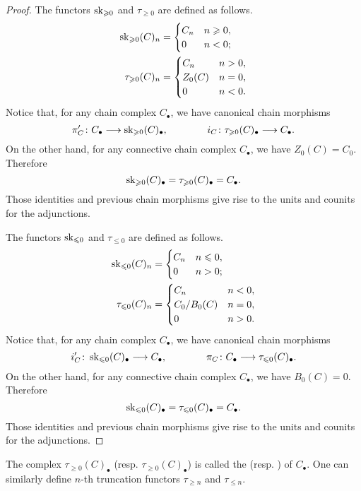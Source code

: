 \begin{proof}
The functors $\operatorname{sk}_{\geqslant0}$ and $\tau_{\ge0}$ are defined as follows.
\begin{align*}
\operatorname{sk}_{\geqslant0}(C)_n & =
\begin{cases}
C_n & n\geqslant0,\\
0 & n<0;
\end{cases} \\
\tau_{\geqslant0}(C)_n & =
\begin{cases}
C_n & n>0,\\
Z_0(C) & n=0,\\
0 & n<0.
\end{cases}
\end{align*}
Notice that, for any chain complex $C_{\bullet}$,
we have canonical chain morphisms
\[
\pi'_C\colon C_{\bullet}\longrightarrow\operatorname{sk}_{\geqslant0}(C)_{\bullet},\qquad\qquad
i_C\colon \tau_{\geqslant0}(C)_{\bullet}\longrightarrow C_{\bullet}.
\]
On the other hand, for any connective chain complex $C_{\bullet}$,
we have $Z_0(C)=C_0$. Therefore
\[
\operatorname{sk}_{\geqslant0}(C)_{\bullet} = \tau_{\geqslant0}(C)_{\bullet} = C_{\bullet}.
\]
Those identities and previous chain morphisms give rise to the 
units and counits for the adjunctions.

The functors $\operatorname{sk}_{\leqslant0}$ and $\tau_{\le0}$ are defined as follows.
\begin{align*}
\operatorname{sk}_{\leqslant0}(C)_n & =
\begin{cases}
C_n & n\leqslant0,\\
0 & n>0;
\end{cases} \\
\tau_{\leqslant0}(C)_n & =
\begin{cases}
C_n & n<0,\\
C_0/B_0(C) & n=0,\\
0 & n>0.
\end{cases}
\end{align*}
Notice that, for any chain complex $C_{\bullet}$,
we have canonical chain morphisms
\[
i'_C\colon \operatorname{sk}_{\leqslant0}(C)_{\bullet}\longrightarrow C_{\bullet},\qquad\qquad
\pi_C\colon C_{\bullet}\longrightarrow\tau_{\leqslant0}(C)_{\bullet}.
\]
On the other hand, for any connective chain complex $C_{\bullet}$,
we have $B_0(C)=0$. Therefore
\[
\operatorname{sk}_{\leqslant0}(C)_{\bullet} = \tau_{\leqslant0}(C)_{\bullet} = C_{\bullet}.
\]
Those identities and previous chain morphisms give rise to the 
units and counits for the adjunctions.
\end{proof}
\begin{Rem}
The complex $\tau_{\ge0}(C)_{\bullet}$ (resp. $\tau_{\ge0}(C)_{\bullet}$) 
is called the 
(resp. )
of $C_{\bullet}$. 
One can similarly define $n$-th truncation functors 
$\tau_{\ge n}$ and $\tau_{\le n}$.
\end{Rem}

